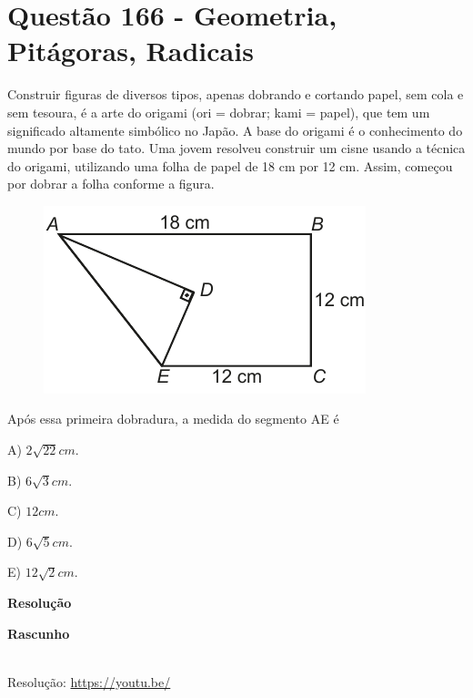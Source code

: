 \section{Questão 166 - Geometria, Pitágoras, Radicais}

Construir figuras de diversos tipos, apenas dobrando e cortando papel, sem cola e sem tesoura, é a arte do origami (ori = dobrar; kami = papel), que tem um significado altamente simbólico no Japão. A base do origami é o conhecimento do mundo por base do tato. Uma jovem resolveu construir um cisne usando a técnica do origami, utilizando uma folha de papel de 18 cm por 12 cm. Assim, começou por dobrar a folha conforme a figura.

\begin{figure}[H]
    \centering
    \includegraphics[width=0.48\linewidth]{Q166.pdf}
    \label{fig:q166}
\end{figure}

Após essa primeira dobradura, a medida do segmento AE é

A) $ 2\sqrt{22} cm $.

B) $ 6\sqrt{3} cm $.

C) $ 12 cm $.

D) $ 6\sqrt{5} cm $.

E) $ 12\sqrt{2} cm $.

\textbf{Resolução}

\textbf{Rascunho}

\quad


\begin{center}
    \href{https://youtu.be/}{
    }\\
    Resolução: \url{https://youtu.be/}
\end{center}
